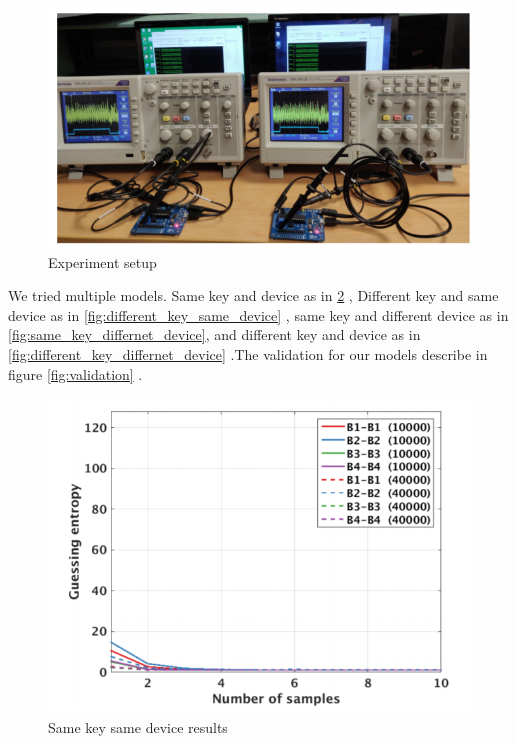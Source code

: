 \begin{figure}
    \centering
    \includegraphics[scale=0.5]{images/chapter8/setup.PNG}
    \caption{Experiment setup}
    \label{fig:exp_setup}
\end{figure}

We tried multiple models. Same key and device as in \ref{fig:same_key_same_device} , Different key and same device as in \ref{fig:different_key_same_device} , same key and different device as in \ref{fig:same_key_differnet_device}, and different key and device as in \ref{fig:different_key_differnet_device} .The validation for our models describe in figure \ref{fig:validation} .

\begin{figure}
    \centering
    \includegraphics[scale=0.5]{images/chapter8/same_key_same_device.PNG}
    \caption{Same key same device results}
    \label{fig:same_key_same_device}
\end{figure}

